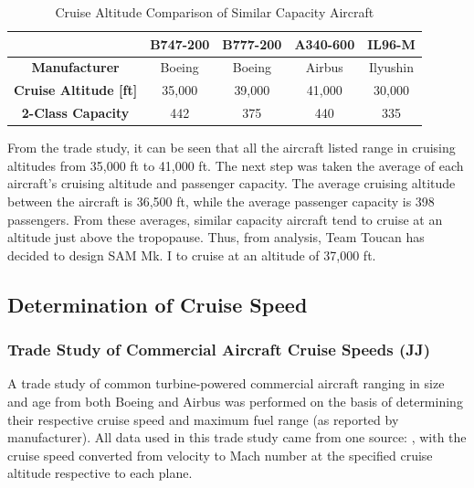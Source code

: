 \begin{table}[!h]
    \centering
        \caption{Cruise Altitude Comparison of Similar Capacity Aircraft}
    \begin{tabular}{|c||c|c|c|c|}\toprule
         & \textbf{B747-200} & \textbf{B777-200} & \textbf{A340-600} & \textbf{IL96-M}\\ \hline \hline
         \textbf{Manufacturer} & Boeing & Boeing & Airbus & Ilyushin \\ \hline
         \textbf{Cruise Altitude [ft]} &  35,000 & 39,000 & 41,000 & 30,000 \\ \hline
         \textbf{2-Class Capacity} & 442 & 375 & 440 & 335\\ \bottomrule
    \end{tabular}
    \label{cruxalt}
\end{table}

From the trade study, it can be seen that all the aircraft listed range in cruising altitudes from 35,000 ft to 41,000 ft. The next step was taken the average of each aircraft's cruising altitude and passenger capacity. The average cruising altitude between the aircraft is 36,500 ft, while the average passenger capacity is 398 passengers. From these averages, similar capacity aircraft tend to cruise at an altitude just above the tropopause. Thus, from analysis, Team Toucan has decided to design SAM Mk. I to cruise at an altitude of 37,000 ft.

\subsection{Determination of Cruise Speed}
\label{crusspeed}
\subsubsection{Trade Study of Commercial Aircraft Cruise Speeds (JJ)}
A trade study of common turbine-powered commercial aircraft ranging in size and age from both Boeing and Airbus was performed on the basis of determining their respective cruise speed and maximum fuel range (as reported by manufacturer).  All data used in this trade study came from one source:  \cite{butterworth}, with the cruise speed converted from velocity to Mach number at the specified cruise altitude respective to each plane. 

